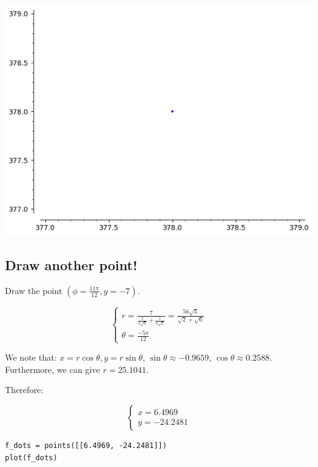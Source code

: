 \documentclass[letterpaper]{article}
\begin{document}
\begin{center}
\includegraphics[width=.9\linewidth]{2022-06-01_09-38-21_screenshot.png}
\end{center}

\subsection{Draw another point!}
\label{sec:orgd4a7cc8}
Draw the point \((\phi = \frac{11\pi}{12}, y=-7)\).

\begin{equation}
\begin{cases}
   r = \frac{7}{\frac{1}{4\sqrt{6}} + \frac{1}{4\sqrt{2}}} = \frac{56\sqrt{3}}{\sqrt{2}+\sqrt{6}} \\
   \theta = \frac{-5\pi}{12}
\end{cases}
\end{equation}

We note that: \(x = r\cos\theta, y=r\sin\theta\), \(\sin\theta \approx -0.9659\), \(\cos\theta \approx 0.2588\). Furthermore, we can give \(r=25.1041\). 

Therefore:

\begin{equation}
\begin{cases}
     x = 6.4969\\
    y = -24.2481
\end{cases}
\end{equation}

\begin{verbatim}
f_dots = points([[6.4969, -24.2481]])
plot(f_dots)
\end{verbatim}
\end{document}
